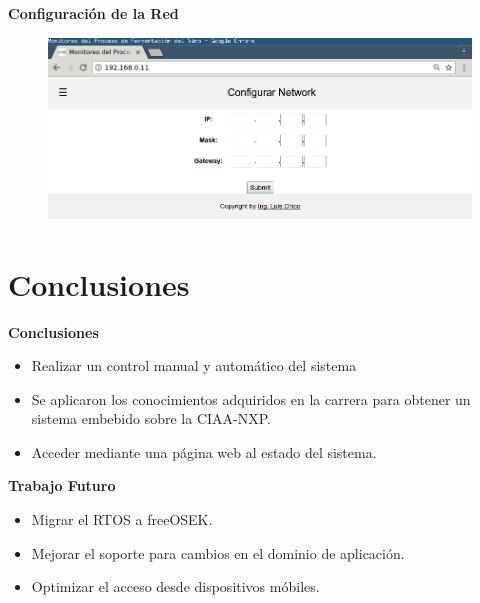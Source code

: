 \documentclass[11pt]{beamer}
\begin{document}
\begin{frame}{\textbf{\LARGE{Configuración de la Red}}}
  \vspace{-.7cm}
  \begin{figure}[H]
    {\includegraphics[width=1\textwidth]{./imagenes/config_network.png}}
  \end{figure}	
\end{frame}

\section{Conclusiones}

\begin{frame}{\textbf{\LARGE{Conclusiones}}}
  \fontsize{16pt}{16}\selectfont
  \begin{itemize}
    \item Realizar un control manual y automático del sistema
      \vspace{10px}
    \item Se aplicaron los conocimientos adquiridos en la carrera para obtener un sistema embebido sobre la CIAA-NXP.
      \vspace{10px}
    \item Acceder mediante una página web al estado del sistema.
  \end{itemize}
\end{frame}

\begin{frame}{\textbf{\LARGE{Trabajo Futuro}}}
  \fontsize{16pt}{16}\selectfont
  \begin{itemize}
    \item Migrar el RTOS a freeOSEK.
      \vspace{15px}
    \item Mejorar el soporte para cambios en el dominio de aplicación.
      \vspace{15px}
    \item Optimizar el acceso desde dispositivos móbiles.
  \end{itemize}
\end{frame}
\end{document}
